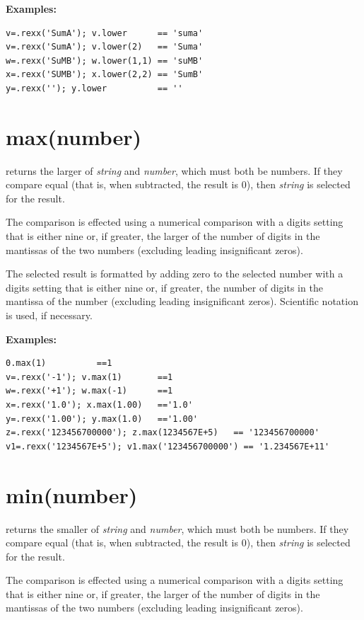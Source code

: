\textbf{Examples:}
\begin{lstlisting}
v=.rexx('SumA'); v.lower      == 'suma'
v=.rexx('SumA'); v.lower(2)   == 'Suma'
w=.rexx('SuMB'); w.lower(1,1) == 'suMB'
x=.rexx('SUMB'); x.lower(2,2) == 'SumB'
y=.rexx(''); y.lower          == ''
\end{lstlisting}

\section{max(number)}\label{refmax}

returns the larger of \emph{string} and \emph{number}, which
must both be numbers.  If they compare equal (that is, when subtracted,
the result is 0), then \emph{string} is selected for the result.
 
The comparison is effected using a numerical comparison with a digits
setting that is either nine or, if greater, the larger of the number of
digits in the mantissas of the two numbers (excluding leading
insignificant zeros).
 
The selected result is formatted by adding zero to the selected number
with a digits setting that is either nine or, if greater, the number of
digits in the mantissa of the number (excluding leading insignificant
zeros).
Scientific notation is used, if necessary.
 
\textbf{Examples:}
\begin{lstlisting}
0.max(1)          ==1
v=.rexx('-1'); v.max(1)       ==1
w=.rexx('+1'); w.max(-1)      ==1
x=.rexx('1.0'); x.max(1.00)   =='1.0'
y=.rexx('1.00'); y.max(1.0)   =='1.00'
z=.rexx('123456700000'); z.max(1234567E+5)   == '123456700000'
v1=.rexx('1234567E+5'); v1.max('123456700000') == '1.234567E+11'
\end{lstlisting}

\section{min(number)}\label{refmin}

returns the smaller of \emph{string} and \emph{number}, which
must both be numbers.  If they compare equal (that is, when subtracted,
the result is 0), then \emph{string} is selected for the result.
 
The comparison is effected using a numerical comparison with a digits
setting that is either nine or, if greater, the larger of the number of
digits in the mantissas of the two numbers (excluding leading
insignificant zeros).
 
